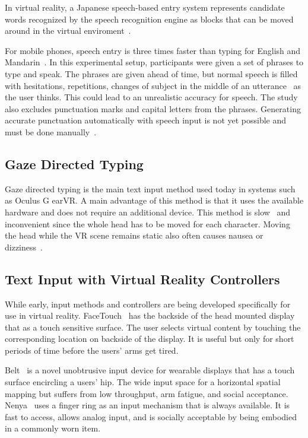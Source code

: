 \documentclass{sigchi}
\begin{document}
In virtual reality, a Japanese speech-based entry system represents candidate words recognized by the speech recognition engine as blocks that can be moved around in the virtual enviroment~\cite{osawa2002multimodal}. 

For mobile phones, speech entry is three times faster than typing for English and Mandarin~\cite{ruan2016speech}.  
In this experimental setup, participants were given a set of phrases to type and speak.
The phrases are given ahead of time, but normal speech is filled with hesitations, repetitions, changes of subject in the middle of an utterance~\cite{forsberg2003speech} as the user thinks.
This could lead to an unrealistic accuracy for speech.  
The study also excludes punctuation marks and capital letters from the phrases.
Generating accurate punctuation  automatically with speech input is not yet possible and must be done manually~\cite{chen1999speech}.

\subsection{Gaze Directed Typing}
Gaze directed typing is the main text input method used today in systems such as Oculus G earVR. A main advantage of this method is that it uses the available hardware and does not require an additional device. This method is slow~\cite{card1983psychology, mackenzie1992fitts} and inconvenient since the whole head has to be moved for each character.
Moving the head while the VR scene remains static also often causes nausea or dizziness~\cite{atienza2016interaction}.   

\subsection{Text Input with Virtual Reality Controllers}
While early, input methods and controllers are being developed specifically for use in virtual reality.
FaceTouch~\cite{Gugenheimer:2016:FTI:2851581.2890242} has the backside of the head mounted display that as a touch sensitive surface.
The user selects virtual content by touching the corresponding location on backside of the display.
It is useful but only for short periods of time before the users' arms get tired.

Belt~\cite{dobbelstein2015belt} is a novel unobtrusive input device for wearable displays that has a touch surface encircling a users' hip.
The wide input space for a horizontal spatial mapping but suffers from low throughput, arm fatigue, and social acceptance.
Nenya~\cite{ashbrook2011nenya} uses a finger ring as an input mechanism that is always available.
It is fast to access, allows analog input, and is socially acceptable by being embodied in a commonly worn item.
\end{document}
